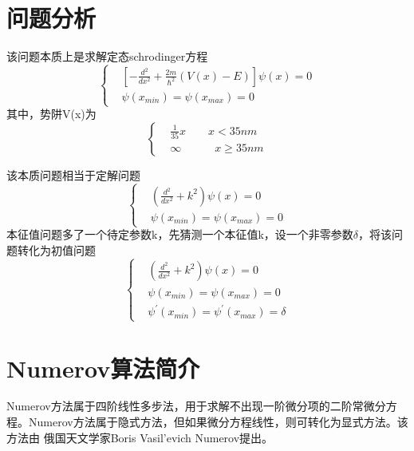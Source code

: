 \documentclass[twoside,twocolumn]{article}
\begin{document}
\begin{CJK*}{UTF8}{gkai}

\section{问题分析}
该问题本质上是求解定态schrodinger方程
\begin{equation*}
\left\{
\begin{aligned}
&\left[-\frac{d^{2}}{dx^{2}}+\frac{2m}{\hbar^{2}}(V(x)-E)\right]\psi(x)=0\\
&\psi(x_{min})=\psi(x_{max})=0
\end{aligned}
\right.
\end{equation*}
其中，势阱V(x)为
\begin{equation*}
\left\{
\begin{aligned}
&\frac{1}{35}x \qquad x<35nm\\
&\infty \quad\qquad x \geqslant 35nm
\end{aligned}
\right.
\end{equation*}

该本质问题相当于定解问题
\begin{equation*}
\left\{
\begin{aligned}
&\left(\frac{d^{2}}{dx^{2}}+k^{2}\right)\psi(x)=0\\
&\psi(x_{min})=\psi(x_{max})=0
\end{aligned}
\right.
\end{equation*}
本征值问题多了一个待定参数k，先猜测一个本征值k，设一个非零参数$\delta$，将该问题转化为初值问题
\begin{equation*}
\left\{
\begin{aligned}
&\left(\frac{d^{2}}{dx^{2}}+k^{2}\right)\psi(x)=0\\
&\psi(x_{min})=\psi(x_{max})=0\\
&\psi^{\prime}(x_{min})=\psi^{\prime}(x_{max})=\delta
\end{aligned}
\right.
\end{equation*}


\section{Numerov算法简介}
Numerov方法属于四阶线性多步法，用于求解不出现一阶微分项的二阶常微分方程。Numerov方法属于隐式方法，但如果微分方程线性，则可转化为显式方法。该方法由 俄国天文学家Boris Vasil'evich Numerov提出。

\end{CJK*}
\end{document}
